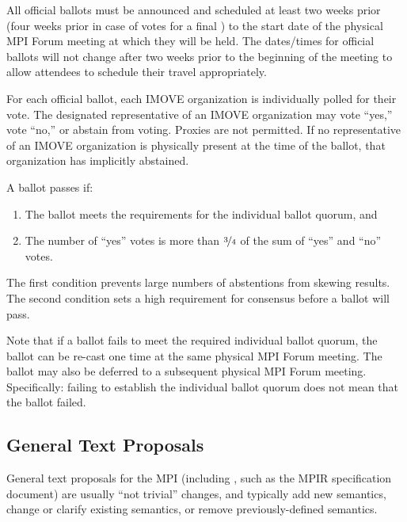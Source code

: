 All official ballots must be announced and scheduled at least two
weeks prior (four weeks prior in case of votes for a final {\color{red}{MPI Standard
Document}}) to the start date of the physical MPI Forum meeting at
which they will be held.  The dates/times for official ballots will
not change after two weeks prior to the beginning of the meeting to
allow attendees to schedule their travel appropriately.

For each official ballot, each IMOVE organization is individually
polled for their vote.  The designated representative of an IMOVE
organization may vote ``yes,'' vote ``no,'' or abstain from voting.
Proxies are not permitted.  If no representative of an IMOVE
organization is physically present at the time of the ballot, that
organization has implicitly abstained.

A ballot passes if:

\begin{enumerate}
\item The ballot meets the requirements for the individual ballot
  quorum, and
\item The number of ``yes'' votes is more than $\nicefrac{3}{4}$ of
  the sum of ``yes'' and ``no'' votes.
\end{enumerate}

\begin{rationale}
  The first condition prevents large numbers of abstentions from
  skewing results.  The second condition sets a high requirement for
  consensus before a ballot will pass.
\end{rationale}

Note that if a ballot fails to meet the required individual ballot
quorum, the ballot can be re-cast one time at the same physical MPI
Forum meeting.  The ballot may also be deferred to a subsequent
physical MPI Forum meeting.  Specifically: failing to establish the
individual ballot quorum does not mean that the ballot failed.


\subsection{General Text Proposals}
\label{subsec:general-text-proposals}

General text proposals for the MPI {\color{red}{Standard Document}} (including
{\color{red}{MPI Companion Documents}}, such as the MPIR specification
document) are usually ``not trivial'' changes, and typically add new
semantics, change or clarify existing semantics, or remove
previously-defined semantics.

